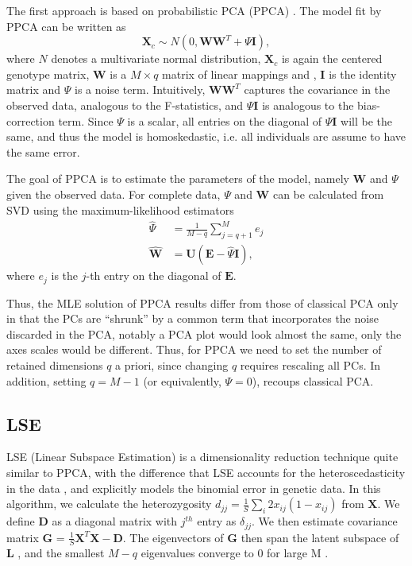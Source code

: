 \documentclass[12pt, letterpaper]{article}
\newcommand{\BI}{\mathbf{I}}
\newcommand{\MX}{\mathbf{X}}
\newcommand{\MG}{\mathbf{G}}
\begin{document}
The first approach is based on probabilistic PCA (PPCA) \cite{tipping_probabilistic_1999-1, agrawal_scalable_2020}. The model fit by PPCA can be written as 
\begin{equation*}
    \MX_c \sim N(0, \mathbf{W}\mathbf{W}^T + \Psi \BI),
\end{equation*} 
where $N$ denotes a multivariate normal distribution, $\MX_c$ is again the centered genotype matrix, $\mathbf{W}$ is a $M \times q$ matrix of linear mappings and , $\BI$ is the identity matrix and $\Psi$ is a noise term. Intuitively, $\mathbf{W}\mathbf{W}^T$ captures the covariance in the observed data, analogous to the F-statistics, and $\Psi \BI$ is analogous to the bias-correction term. Since $\Psi$ is a scalar, all entries on the diagonal of $\Psi \BI$ will be the same, and thus the model is homoskedastic, i.e. all individuals are assume to have the same error.

The goal of PPCA is to estimate the parameters of the model, namely $\mathbf{W}$ and $\Psi$ given the observed data. For complete data, $\Psi$ and $\mathbf{W}$ can be calculated from SVD using the maximum-likelihood estimators
\begin{align*}
    \hat{\Psi} &= \frac{1}{M-q}\sum_{j=q+1}^M e_{j}\\
    \hat{\mathbf{W}} &= \mathbf{U}(\mathbf{E} - \hat{\Psi}\BI),
\end{align*}
where $e_j$ is the $j$-th entry on the diagonal of $\mathbf{E}$.

Thus, the MLE solution of PPCA results differ from those of classical PCA only in that the PCs are ``shrunk'' by a common term that incorporates the noise discarded in the PCA, notably a PCA plot would look almost the same, only the axes scales would be different. Thus, for PPCA we need to set the number of retained dimensions $q$ a priori, since changing $q$ requires rescaling all PCs. In addition, setting $q=M-1$ (or equivalently, $\Psi=0$), recoups classical PCA.


\subsection{LSE}\label{theory-lse}
LSE (Linear Subspace Estimation) is a dimensionality reduction technique quite similar to PPCA, with the difference that LSE accounts for the heteroscedasticity in the data \cite{chen_consistent_2015}, and explicitly models the binomial error in genetic data. In this algorithm, we calculate the heterozygosity  $d_{jj} = \frac{1}{S}\sum_i 2x_{ij}(1- x_{ij})$ from $\MX$. We define $\mathbf{D}$ as a diagonal matrix with $j^{th}$ entry as $\delta_{jj}$. We then estimate covariance matrix $\MG$ = $\frac{1}{S}\MX^T\MX - \mathbf{D}$. The eigenvectors of $\mathbf{G}$ then span the latent subspace of $\mathbf{L}$ , and the smallest $M-q$ eigenvalues converge to 0 for large M \cite{cabreros_likelihood-free_2019}.
\end{document}
